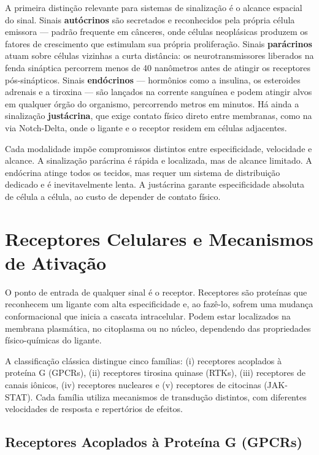 A primeira distinção relevante para sistemas de sinalização é o alcance
espacial do sinal. Sinais \textbf{autócrinos} são secretados e reconhecidos pela
própria célula emissora --- padrão frequente em cânceres, onde células neoplásicas
produzem os fatores de crescimento que estimulam sua própria proliferação.
Sinais \textbf{parácrinos} atuam sobre células vizinhas a curta distância: os
neurotransmissores liberados na fenda sináptica percorrem menos de 40 nanômetros
antes de atingir os receptores pós-sinápticos. Sinais \textbf{endócrinos} ---
hormônios como a insulina, os esteroides adrenais e a tiroxina --- são lançados
na corrente sanguínea e podem atingir alvos em qualquer órgão do organismo,
percorrendo metros em minutos. Há ainda a sinalização \textbf{justácrina}, que
exige contato físico direto entre membranas, como na via Notch-Delta, onde o
ligante e o receptor residem em células adjacentes.

Cada modalidade impõe compromissos distintos entre especificidade, velocidade e
alcance. A sinalização parácrina é rápida e localizada, mas de alcance limitado.
A endócrina atinge todos os tecidos, mas requer um sistema de distribuição
dedicado e é inevitavelmente lenta. A justácrina garante especificidade absoluta
de célula a célula, ao custo de depender de contato físico.

\section{Receptores Celulares e Mecanismos de Ativação}
\label{sec:09-receptores}

O ponto de entrada de qualquer sinal é o receptor. Receptores são proteínas que
reconhecem um ligante com alta especificidade e, ao fazê-lo, sofrem uma mudança
conformacional que inicia a cascata intracelular. Podem estar localizados na
membrana plasmática, no citoplasma ou no núcleo, dependendo das propriedades
físico-químicas do ligante.

A classificação clássica distingue cinco famílias: (i) receptores acoplados à
proteína G (GPCRs), (ii) receptores tirosina quinase (RTKs), (iii) receptores de
canais iônicos, (iv) receptores nucleares e (v) receptores de citocinas
(JAK-STAT). Cada família utiliza mecanismos de transdução distintos, com
diferentes velocidades de resposta e repertórios de efeitos.

\subsection{Receptores Acoplados à Proteína G (GPCRs)}
\label{subsec:09-gpcr}


